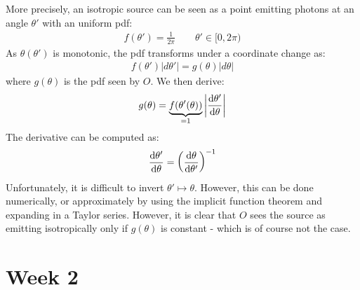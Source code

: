 \documentclass[../template.tex]{subfiles}
\begin{document}
More precisely, an isotropic source can be seen as a point emitting photons at an angle $\theta'$ with an uniform pdf:
\begin{align*}
    f(\theta') = \frac{1}{2\pi} \qquad \theta' \in [0, 2\pi) 
\end{align*} 
As $\theta(\theta')$ is monotonic, the pdf transforms under a coordinate change as:
\begin{align*}
    f(\theta') |d \theta'| = g(\theta) |d \theta|
\end{align*} 
where $g(\theta)$ is the pdf seen by $O$. We then derive:
\begin{align*}
    g(\theta) = \underbrace{f(\theta'(\theta))}_{=1}  \left|\dv{\theta'}{\theta} (\theta)\right|
\end{align*} 
The derivative can be computed as:
\begin{align*}
    \dv{\theta'}{\theta} = \left(\dv{\theta}{\theta'} (\theta(\theta')) \right)^{-1}
\end{align*}
Unfortunately, it is difficult to invert $\theta' \mapsto \theta$. However, this can be done numerically, or approximately by using the implicit function theorem and expanding in a Taylor series. However, it is clear that $O$ sees the source as emitting isotropically only if $g(\theta)$ is constant - which is of course not the case.  

\chapter{Week 2}
\end{document}
